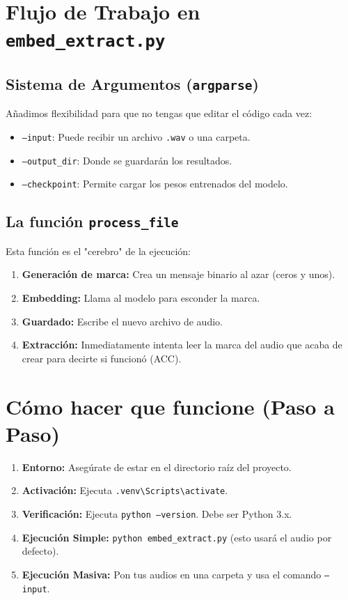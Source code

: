 \documentclass[11pt,a4paper]{article}
\begin{document}
\section{Flujo de Trabajo en \texttt{embed\_extract.py}}

\subsection{Sistema de Argumentos (\texttt{argparse})}
Añadimos flexibilidad para que no tengas que editar el código cada vez:
\begin{itemize}
    \item \texttt{--input}: Puede recibir un archivo \texttt{.wav} o una carpeta.
    \item \texttt{--output\_dir}: Donde se guardarán los resultados.
    \item \texttt{--checkpoint}: Permite cargar los pesos entrenados del modelo.
\end{itemize}

\subsection{La función \texttt{process\_file}}
Esta función es el "cerebro" de la ejecución:
\begin{enumerate}
    \item \textbf{Generación de marca:} Crea un mensaje binario al azar (ceros y unos).
    \item \textbf{Embedding:} Llama al modelo para esconder la marca.
    \item \textbf{Guardado:} Escribe el nuevo archivo de audio.
    \item \textbf{Extracción:} Inmediatamente intenta leer la marca del audio que acaba de crear para decirte si funcionó (ACC).
\end{enumerate}

\section{Cómo hacer que funcione (Paso a Paso)}

\begin{tcolorbox}[colback=green!5!white,colframe=green!75!black,title=Guía de Configuración]
\begin{enumerate}
    \item \textbf{Entorno:} Asegúrate de estar en el directorio raíz del proyecto.
    \item \textbf{Activación:} Ejecuta \texttt{.venv\textbackslash Scripts\textbackslash activate}.
    \item \textbf{Verificación:} Ejecuta \texttt{python --version}. Debe ser Python 3.x.
    \item \textbf{Ejecución Simple:} \texttt{python embed\_extract.py} (esto usará el audio por defecto).
    \item \textbf{Ejecución Masiva:} Pon tus audios en una carpeta y usa el comando \texttt{--input}.
\end{enumerate}
\end{tcolorbox}
\end{document}
